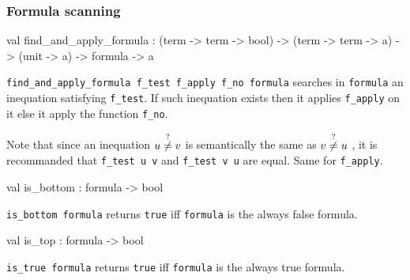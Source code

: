 \subsubsection{Formula scanning}




\label{val:Term.find-underscoreand-underscoreapply-underscoreformula}\begin{ocamldoccode}
val find_and_apply_formula :
  (term -> term -> bool) ->
  (term -> term -> {\textquotesingle}a) -> (unit -> {\textquotesingle}a) -> formula -> {\textquotesingle}a
\end{ocamldoccode}
\begin{ocamldocdescription}
{\tt{find\_and\_apply\_formula f\_test f\_apply f\_no formula}} searches in {\tt{formula}} an inequation satisfying {\tt{f\_test}}. 
   If such inequation exists then it applies {\tt{f\_apply}} on it else it apply the function {\tt{f\_no}}.


   Note that since an inequation $u \stackrel{?}{\neq} v$  is semantically the same as $v \stackrel{?}{\neq} u$ , it is recommanded that
   {\tt{f\_test u v}} and {\tt{f\_test v u}} are equal. Same for {\tt{f\_apply}}.


\end{ocamldocdescription}




\label{val:Term.is-underscorebottom}\begin{ocamldoccode}
val is_bottom : formula -> bool
\end{ocamldoccode}
\begin{ocamldocdescription}
{\tt{is\_bottom formula}} returns {\tt{true}} iff {\tt{formula}} is the always false formula.


\end{ocamldocdescription}




\label{val:Term.is-underscoretop}\begin{ocamldoccode}
val is_top : formula -> bool
\end{ocamldoccode}
\begin{ocamldocdescription}
{\tt{is\_true formula}} returns {\tt{true}} iff {\tt{formula}} is the always true formula.


\end{ocamldocdescription}




